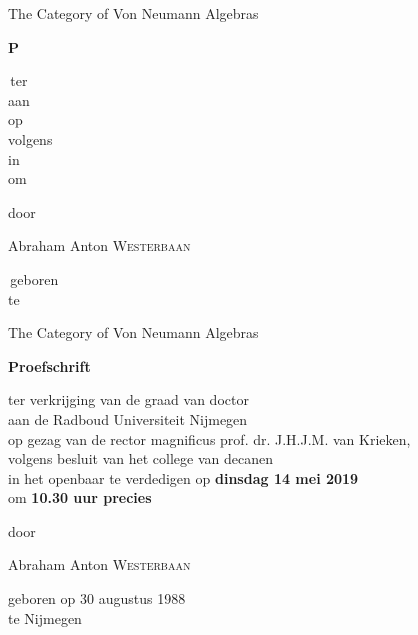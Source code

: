 \documentclass[b5paper]{book}
\begin{document}

\newcommand{\titelpagina}[4]{%
\vspace*{5em}
\begin{center}
{\huge\sffamily\color{darkblue}The Category of Von Neumann Algebras}
\end{center}
\vspace{2em}
\begin{center}
{\par\noindent\sffamily\color{darkblue}\large\textbf{#1}}
\end{center}
\begin{center}
#2
\end{center}
\vspace{10em}
\begin{center}%
#3
\end{center}%
\begin{center}%
\large\color{darkblue}Abraham Anton \textsc{Westerbaan}
\end{center}%
\begin{center}%
#4
\end{center}
\newpage
}

\newcommand{\whiteout}[1]{{\color{white}#1}}

\titelpagina{\whiteout{P}$\,$}{$\,$\whiteout{ter}\\
\whiteout{aan}$\,$\\
\whiteout{op}$\,$\\
\whiteout{volgens}$\,$\\
\whiteout{in}$\,$\\
\whiteout{om}$\,$}{\whiteout{door}}{$\,$\whiteout{geboren}$\,$\\
\whiteout{te}$\,$}

\vspace*{1em}
\newpage

\titelpagina{Proefschrift}{ter verkrijging van de graad van doctor\\
aan de Radboud Universiteit Nijmegen\\
op gezag van de rector magnificus prof. dr. J.H.J.M. van Krieken,\\
volgens besluit van het college van decanen \\
in het openbaar te verdedigen op 
\textbf{dinsdag 14 mei 2019} \\
om \textbf{10.30 uur precies}}{door}{geboren op 30 augustus 1988\\
te Nijmegen}
\end{document}
